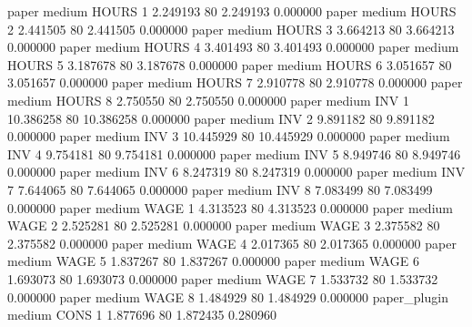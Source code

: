               paper     medium    HOURS                 1  2.249193 80       2.249193           0.000000
              paper     medium    HOURS                 2  2.441505 80       2.441505           0.000000
              paper     medium    HOURS                 3  3.664213 80       3.664213           0.000000
              paper     medium    HOURS                 4  3.401493 80       3.401493           0.000000
              paper     medium    HOURS                 5  3.187678 80       3.187678           0.000000
              paper     medium    HOURS                 6  3.051657 80       3.051657           0.000000
              paper     medium    HOURS                 7  2.910778 80       2.910778           0.000000
              paper     medium    HOURS                 8  2.750550 80       2.750550           0.000000
              paper     medium      INV                 1 10.386258 80      10.386258           0.000000
              paper     medium      INV                 2  9.891182 80       9.891182           0.000000
              paper     medium      INV                 3 10.445929 80      10.445929           0.000000
              paper     medium      INV                 4  9.754181 80       9.754181           0.000000
              paper     medium      INV                 5  8.949746 80       8.949746           0.000000
              paper     medium      INV                 6  8.247319 80       8.247319           0.000000
              paper     medium      INV                 7  7.644065 80       7.644065           0.000000
              paper     medium      INV                 8  7.083499 80       7.083499           0.000000
              paper     medium     WAGE                 1  4.313523 80       4.313523           0.000000
              paper     medium     WAGE                 2  2.525281 80       2.525281           0.000000
              paper     medium     WAGE                 3  2.375582 80       2.375582           0.000000
              paper     medium     WAGE                 4  2.017365 80       2.017365           0.000000
              paper     medium     WAGE                 5  1.837267 80       1.837267           0.000000
              paper     medium     WAGE                 6  1.693073 80       1.693073           0.000000
              paper     medium     WAGE                 7  1.533732 80       1.533732           0.000000
              paper     medium     WAGE                 8  1.484929 80       1.484929           0.000000
       paper_plugin     medium     CONS                 1  1.877696 80       1.872435           0.280960
